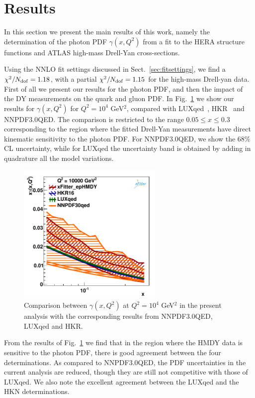 \section{Results}
\label{sec:results}

In this section we present the main results of this work, namely the determination
of the photon PDF $\gamma(x,Q^2)$ from a fit to the HERA structure functions
and ATLAS high-mass Drell-Yan cross-sections.

Using the NNLO fit settings discussed in Sect.~\ref{sec:fitsettings}, we find
a $\chi^{2}/N_{\rm dof} = 1.18$,
with a partial $\chi^2/N_{\rm dof} = 1.15$ for the high-mass Drell-yan data.
%
First of all we present our results for the photon PDF, and then the impact
of the DY measurements on the quark and gluon PDF.
%
In Fig.~\ref{photon_zoom} we show our results
for $\gamma(x,Q^2)$ for $Q^2=10^4$ GeV$^2$,
compared with LUXqed~\cite{Manohar:2016nzj}, HKR~\cite{Harland-Lang:2016apc}
and NNPDF3.0QED.
%
The comparison is restricted to the range $0.05 \le x \le 0.3$ corresponding
to the region where the fitted Drell-Yan measurements have direct kinematic sensitivity
to the photon PDF.
%
For NNPDF3.0QED, we show the 68\% CL uncertainty, while for LUXqed the uncertainty band
is obtained by adding in quadrature all the model variations.

\begin{figure}[h]
\includegraphics[width=7cm]{figs/photon_comp_10000.pdf} 
\caption{Comparison between $\gamma(x,Q^2)$ at $Q^2=10^4$ GeV$^2$ in the present
  analysis with the corresponding results from NNPDF3.0QED, LUXqed and HKR.}
\label{photon_zoom}
\end{figure}

From the results of Fig.~\ref{photon_zoom} we find that in the region where the HMDY data is
sensitive to the photon PDF, there is good agreement between the four determinations.
%
As compared to NNPDF3.0QED, the PDF uncertainties in the current analysis are reduced, though
they are still not competitive with those of LUXqed.
%
We also note the excellent agreement between the LUXqed and the HKN determinations.

